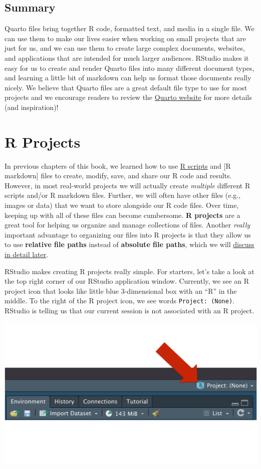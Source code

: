 \documentclass[
  letterpaper,
  DIV=11,
  numbers=noendperiod]{scrreprt}
\begin{document}
\section{Summary}\label{summary-2}

Quarto files bring together R code, formatted text, and media in a
single file. We can use them to make our lives easier when working on
small projects that are just for us, and we can use them to create large
complex documents, websites, and applications that are intended for much
larger audiences. RStudio makes it easy for us to create and render
Quarto files into many different document types, and learning a little
bit of markdown can help us format those documents really nicely. We
believe that Quarto files are a great default file type to use for most
projects and we encourage readers to review the
\href{https://quarto.org/}{Quarto website} for more details (and
inspiration)!

\chapter{R Projects}\label{r-projects}

In previous chapters of this book, we learned how to use
\hyperref[r-scripts]{R scripts} and {[}R markdown{]} files to create,
modify, save, and share our R code and results. However, in most
real-world projects we will actually create \emph{multiple} different R
scripts and/or R markdown files. Further, we will often have other files
(e.g., images or data) that we want to store alongside our R code files.
Over time, keeping up with all of these files can become cumbersome.
\textbf{R projects} are a great tool for helping us organize and manage
collections of files. Another \emph{really} important advantage to
organizing our files into R projects is that they allow us to use
\textbf{relative file paths} instead of \textbf{absolute file paths},
which we will \hyperref[file-paths]{discuss in detail later}.

RStudio makes creating R projects really simple. For starters, let's
take a look at the top right corner of our RStudio application window.
Currently, we see an R project icon that looks like little blue
3-dimensional box with an ``R'' in the middle. To the right of the R
project icon, we see words \texttt{Project:\ (None)}. RStudio is telling
us that our current session is not associated with an R project.

\includegraphics{chapters/r_projects/create_01_icon.png}
\end{document}
